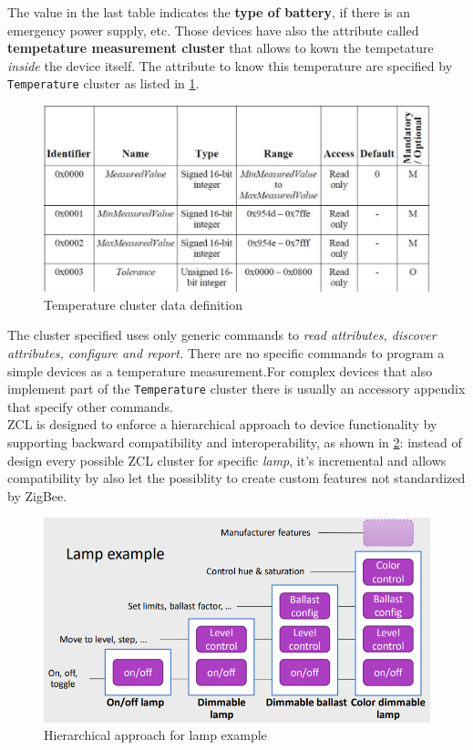 \documentclass[10pt,a4paper]{report}
\theoremstyle{definition}
\begin{document}
The value in the last table indicates the \textbf{type of battery}, if there is an emergency power supply, etc. Those devices have also the attribute called \textbf{tempetature measurement cluster} that allows to kown the tempetature \textit{inside} the device itself.
The attribute to know this temperature are specified by \texttt{Temperature} cluster as listed in \ref{temperature-cluster}.
\begin{figure}[h]
	\centering\includegraphics[scale=0.30]{images/Pasted image 20230311170646.png}
	\caption{Temperature cluster data definition}
	\label{temperature-cluster}

\end{figure}

The cluster specified uses only generic commands to \textit{read attributes, discover attributes, configure and report.} There are no specific commands to program a simple devices as a temperature measurement.For complex devices that also implement part of the \texttt{Temperature} cluster there is usually an accessory appendix that specify other commands.\\
ZCL is designed to enforce a hierarchical approach  to device functionality by supporting backward compatibility and interoperability, as shown in \ref{zcl-interop}: instead of design every possible ZCL cluster for specific \textit{lamp}, it's incremental and allows compatibility by also let the possiblity to create custom features not standardized by ZigBee.
\begin{figure}[h!]
	\centering\includegraphics[scale=0.30]{images/Pasted image 20230311171010.png}
	\caption{Hierarchical approach for lamp example}
	\label{zcl-interop}
\end{figure}
\end{document}
